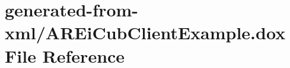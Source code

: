 \hypertarget{AREiCubClientExample_8dox}{}\section{generated-\/from-\/xml/\+A\+R\+Ei\+Cub\+Client\+Example.dox File Reference}
\label{AREiCubClientExample_8dox}
